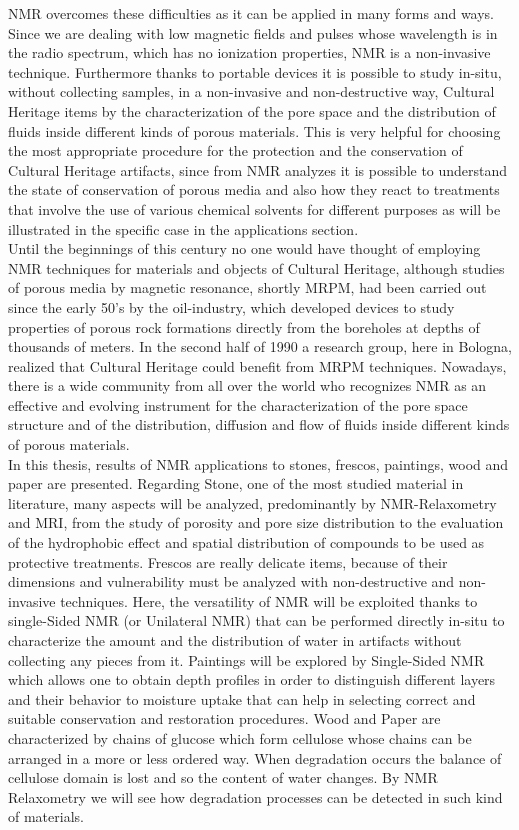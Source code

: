 \documentclass[a4paper,11pt]{report}
\begin{document}
NMR overcomes these difficulties as it can be applied in many forms and ways. Since we are dealing with low magnetic fields and pulses whose wavelength is in the radio spectrum, which has no ionization properties, NMR is a non-invasive technique. Furthermore thanks to portable devices it is possible to study in-situ, without collecting samples, in a non-invasive and non-destructive way, Cultural Heritage items by the characterization of the pore space and the distribution of fluids inside different kinds of porous materials\cite{uno}. This is very helpful for choosing the most appropriate procedure for the protection and the conservation of Cultural Heritage artifacts, since from NMR analyzes it is possible to understand the state of conservation of porous media and also how they react to treatments that involve the use of various chemical solvents for different purposes as will be illustrated in the specific case in the applications section.\\
Until the beginnings of this century no one would have thought of employing NMR techniques for materials and objects of Cultural Heritage, although studies of porous media by magnetic resonance, shortly MRPM, had been carried out since the early 50's by the oil-industry, which developed devices to study properties of porous rock formations directly from the boreholes at depths of thousands of meters\cite{tre}. In the second half of 1990 a research group, here in Bologna, realized that Cultural Heritage could benefit from MRPM techniques. Nowadays, there is a wide community from all over the world who recognizes NMR as an effective and evolving instrument for the characterization of the pore space structure and of the distribution, diffusion and flow of fluids inside different kinds of porous materials\cite{quattro}.\\
In this thesis, results of NMR applications to stones, frescos, paintings, wood and paper are presented. Regarding Stone, one of the most studied material in literature, many aspects will be analyzed, predominantly by NMR-Relaxometry and MRI, from the study of porosity and pore size distribution to the evaluation of the hydrophobic effect and spatial distribution of compounds to be used as protective treatments. Frescos are really delicate items, because of their dimensions and vulnerability must be analyzed with non-destructive and non-invasive techniques. Here, the versatility of NMR will be exploited thanks to single-Sided NMR (or Unilateral NMR) that can be performed directly in-situ to characterize  the amount and the distribution of water in artifacts without collecting any pieces from it. Paintings will be explored by Single-Sided NMR which allows one to obtain depth profiles in order to distinguish different layers and their behavior to moisture uptake that can help in selecting correct and suitable conservation and restoration procedures. Wood and Paper are characterized by chains of glucose which form cellulose whose chains can be arranged in a more or less ordered way. When degradation occurs the balance of cellulose domain is lost and so the content of water changes. By NMR Relaxometry we will see how degradation processes can be detected in such kind of materials.
\clearpage
\end{document}
